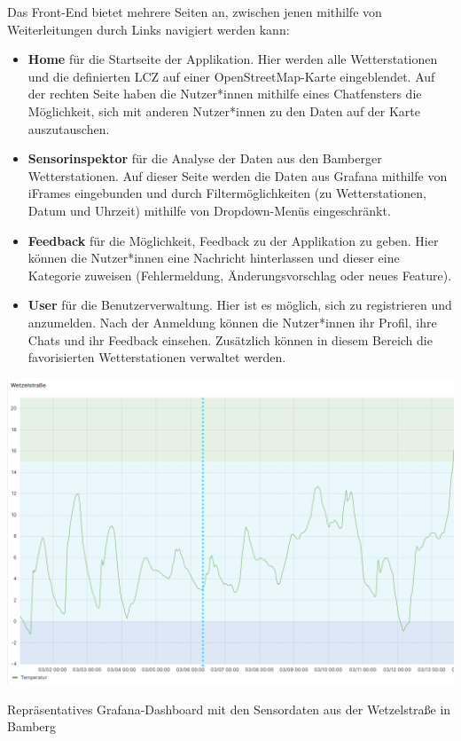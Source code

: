 Das Front-End bietet mehrere Seiten an, zwischen jenen mithilfe von Weiterleitungen durch Links navigiert werden kann:

\begin{itemize}
    \item \textbf{Home} für die Startseite der Applikation. Hier werden alle Wetterstationen und die definierten \ac{LCZ} auf einer OpenStreetMap-Karte eingeblendet. Auf der rechten Seite haben die Nutzer*innen mithilfe eines Chatfensters die Möglichkeit, sich mit anderen Nutzer*innen zu den Daten auf der Karte auszutauschen.
    \item \textbf{Sensorinspektor} für die Analyse der Daten aus den Bamberger Wetterstationen. Auf dieser Seite werden die Daten aus Grafana mithilfe von iFrames eingebunden und durch Filtermöglichkeiten (zu Wetterstationen, Datum und Uhrzeit) mithilfe von Dropdown-Menüs eingeschränkt.
    \item \textbf{Feedback} für die Möglichkeit, Feedback zu der Applikation zu geben. Hier können die Nutzer*innen eine Nachricht hinterlassen und dieser eine Kategorie zuweisen (Fehlermeldung, Änderungsvorschlag oder neues Feature).
    \item \textbf{User} für die Benutzerverwaltung. Hier ist es möglich, sich zu registrieren und anzumelden. Nach der Anmeldung können die Nutzer*innen ihr Profil, ihre Chats und ihr Feedback einsehen. Zusätzlich können in diesem Bereich die favorisierten Wetterstationen verwaltet werden.
\end{itemize}

\begin{marginfigure} %
    \centering
    \includegraphics[width=1\textwidth]{figures/grafana.png}
    \decoRule
    \caption[Grafana-Dashboard]{Repräsentatives Grafana-Dashboard mit den Sensordaten aus der Wetzelstraße in Bamberg}
    \label{fig:grafana}
\end{marginfigure}

